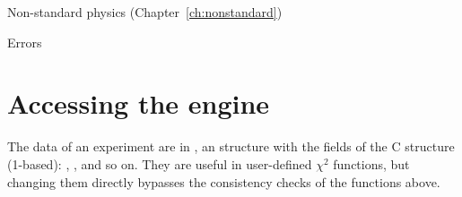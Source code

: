 \begin{apitable}{Non-standard physics (Chapter~\ref{ch:nonstandard})}
\end{apitable}

\begin{apitable}{Errors}
\end{apitable}

\section*{Accessing the engine}

The data of an experiment are in , an 
structure with the fields of the C structure  (1-based):
, ,
 and so on. They are useful in user-defined $\chi^2$
functions, but changing them directly bypasses the consistency checks of the
functions above.

